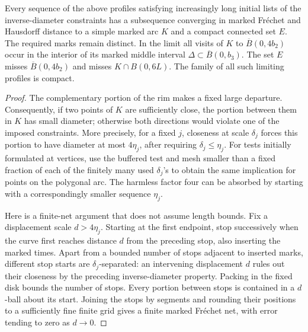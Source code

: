\begin{lemma}\label{lemma:profile-compactness}
Every sequence of the above profiles satisfying increasingly long
initial lists of the inverse-diameter constraints has a subsequence
converging in marked Fr\'echet and Hausdorff distance to a simple marked
arc $K$ and a compact connected set $E$.  The required marks remain
distinct.  In the limit all visits of $K$ to
$\overline B(0,4b_2)$ occur in the interior of its marked middle interval
$\Delta\subset\overline B(0,b_3)$.  The set $E$ misses
$\overline B(0,4b_2)$ and misses $K\cap B(0,6L)$.
The family of all such limiting profiles is compact.
\end{lemma}

\begin{proof}
The complementary portion of the rim makes a fixed large departure.
Consequently, if two points of $K$ are sufficiently close, the portion
between them in $K$ has small diameter; otherwise both directions would
violate one of the imposed constraints.  More precisely, for a fixed
$j$, closeness at scale $\delta_j$ forces this portion to have diameter
at most $4\eta_j$, after requiring $\delta_j\le\eta_j$.  For tests
initially formulated at vertices, use the buffered test and mesh
smaller than a fixed fraction of each of the finitely many used
$\delta_j$'s to obtain the same implication for points on the polygonal
arc.  The harmless factor four can be absorbed by starting with a
correspondingly smaller sequence $\eta_j$.

Here is a finite-net argument that does not assume length bounds.  Fix
a displacement scale $d>4\eta_j$.  Starting at the first endpoint, stop
successively when the curve first reaches distance $d$ from the preceding
stop, also inserting the marked times.  Apart from a bounded number of
stops adjacent to inserted marks, different stop starts are
$\delta_j$-separated: an intervening displacement $d$ rules out their
closeness by the preceding inverse-diameter property.  Packing in the
fixed disk bounds the number of stops.  Every portion between stops is
contained in a $d$-ball about its start.  Joining the stops by segments
and rounding their positions to a sufficiently fine finite grid gives
a finite marked Fr\'echet net, with error tending to zero as $d\to0$.


\end{proof}

